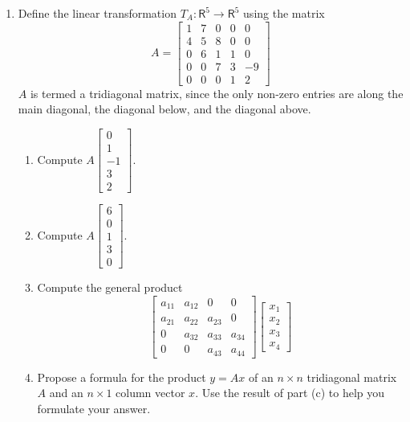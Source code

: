 \documentclass[../main.tex]{subfiles}
\begin{document}
\begin{enumerate}[label=\textbf{1.\arabic*}]
\item Define the linear transformation $T_{A}: \mathsf{R}^{5} \rightarrow \mathsf{R}^{5}$ using the matrix
\label{pro:pro_1_9}
$$
A=\left[\begin{array}{llllc}
1 & 7 & 0 & 0 & 0 \\
4 & 5 & 8 & 0 & 0 \\
0 & 6 & 1 & 1 & 0 \\
0 & 0 & 7 & 3 & -9 \\
0 & 0 & 0 & 1 & 2
\end{array}\right]
$$
$A$ is termed a tridiagonal matrix, since the only non-zero entries are along the main diagonal, the diagonal below, and the diagonal above.

	\begin{enumerate}[label = \textbf{\alph*.}]
		\item Compute $A\left[\begin{array}{c}0 \\ 1 \\ -1 \\ 3 \\ 2\end{array}\right] .$
		\item Compute $A\left[\begin{array}{l}6 \\ 0 \\ 1 \\ 3 \\ 0\end{array}\right] .$
		\item Compute the general product
$$
\left[\begin{array}{cccc}
a_{11} & a_{12} & 0 & 0 \\
a_{21} & a_{22} & a_{23} & 0 \\
0 & a_{32} & a_{33} & a_{34} \\
0 & 0 & a_{43} & a_{44}
\end{array}\right]\left[\begin{array}{c}
x_{1} \\
x_{2} \\
x_{3} \\
x_{4}
\end{array}\right]
$$
		\item Propose a formula for the product $y=A x$ of an $n \times n$ tridiagonal matrix $A$ and an $n \times 1$ column vector $x$. Use the result of part (c) to help you formulate your answer.
	\end{enumerate}


\end{enumerate}
\end{document}
